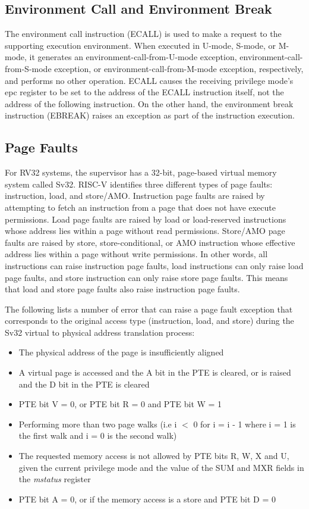 \documentclass[12pt]{article}
\begin{document}
\subsection{Environment Call and Environment Break}
The environment call instruction (ECALL) is used to make a request to the supporting execution environment. When executed in U-mode, S-mode, or M-mode, it generates an environment-call-from-U-mode exception, environment-call-from-S-mode exception, or environment-call-from-M-mode exception, respectively, and performs no other operation. ECALL causes the receiving privilege mode’s epc register to be set to the address of the ECALL instruction itself, not the address of the following instruction. On the other hand, the environment break instruction (EBREAK) raises an exception as part of the instruction execution.

\subsection{Page Faults}
For RV32 systems, the supervisor has a 32-bit, page-based virtual memory system called Sv32. RISC-V identifies three different types of page faults: instruction, load, and store/AMO. Instruction page faults are raised by attempting to fetch an instruction from a page that does not have execute permissions. Load page faults are raised by load or load-reserved instructions whose address lies within a page without read permissions. Store/AMO page faults are raised by store, store-conditional, or AMO instruction whose effective address lies within a page without write permissions. In other words, all instructions can raise instruction page faults, load instructions can only raise load page faults, and store instruction can only raise store page faults. This means that load and store page faults also raise instruction page faults. 

The following lists a number of error that can raise a page fault exception that corresponds to the original access type (instruction, load, and store) during the Sv32 virtual to physical address translation process:
\begin{itemize}
    \item The physical address of the page is insufficiently aligned
    \item A virtual page is accessed and the A bit in the PTE is cleared, or is raised and the D bit in the PTE is cleared
    \item PTE bit V = 0, or PTE bit R = 0 and PTE bit W = 1
    \item Performing more than two page walks (i.e i $<$ 0 for i = i - 1 where i = 1 is the first walk and i = 0 is the second walk)
    \item The requested memory access is not allowed by PTE bits R, W, X and U, given the current privilege mode and the value of the SUM and MXR fields in the \emph{mstatus} register
    \item PTE bit A = 0, or if the memory access is a store and PTE bit D = 0
\end{itemize}
\end{document}
